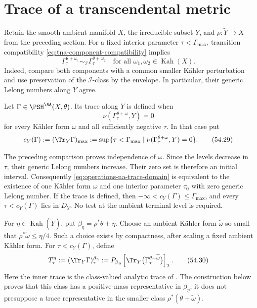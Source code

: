 \section{Trace of a transcendental metric}
\label{sec:operations-na-trace}

Retain the smooth ambient manifold $X$, the irreducible subset $Y$,
and $\rho:\widetilde Y\to X$ from the preceding section.
For a fixed interior parameter $\tau<\Gamma_{\max}$, transition
compatibility \eqref{eq:tna-component-compatibility} implies
\[
 \Gamma_\tau^{\theta+\omega_1}
 \sim_{\mathcal I}\Gamma_\tau^{\theta+\omega_2}
 \quad\text{for all }\omega_1,\omega_2\in\operatorname{Kah}(X).
\]
Indeed, compare both components with a common smaller K\"ahler
perturbation and use preservation of the $\mathcal I$-class by
the envelope.  In particular, their generic Lelong numbers along
$Y$ agree.

\begin{definition}
\label{def:operations-na-trace-domain}
Let $\Gamma\in\PSH^{\NA}(X,\theta)$.
Its trace along $Y$ is defined when
\[
 \nu(\Gamma_\tau^{\theta+\omega},Y)=0
\tag{54.28}\label{eq:operations-na-trace-domain}
\]
for every K\"ahler form $\omega$ and all sufficiently negative
$\tau$.  In that case put
\[
 c_Y(\Gamma):=(\Tr_Y\Gamma)_{\max}
 :=\sup\{\tau<\Gamma_{\max}\mid
          \nu(\Gamma_\tau^{\theta+\omega},Y)=0\}.
\tag{54.29}\label{eq:operations-na-trace-max}
\]
\end{definition}

The preceding comparison proves independence of $\omega$.
Since the levels decrease in $\tau$, their generic Lelong numbers
increase.  Their zero set is therefore an initial interval.
Consequently \eqref{eq:operations-na-trace-domain} is equivalent
to the existence of one K\"ahler form $\omega$ and one interior
parameter $\tau_0$ with zero generic Lelong number.
If the trace is defined, then
$-\infty<c_Y(\Gamma)\leq\Gamma_{\max}$, and every
$\tau<c_Y(\Gamma)$ lies in $D_Y$.
No test at the ambient terminal level is required.

For $\eta\in\operatorname{Kah}(\widetilde Y)$, put
$\beta_\eta=\rho^*\theta+\eta$.
Choose an ambient K\"ahler form $\widetilde\omega$ so small that
$\rho^*\widetilde\omega\leq\eta/4$.
Such a choice exists by compactness, after scaling a fixed ambient
K\"ahler form.  For $\tau<c_Y(\Gamma)$, define
\[
 T_\tau^\eta:=
 (\Tr_Y\Gamma)_\tau^{\beta_\eta}
 :=
 P_{\beta_\eta}
 \left[\Tr_Y\bigl(\Gamma_\tau^{\theta+\widetilde\omega}\bigr)
 \right]_{\mathcal I}.
\tag{54.30}\label{eq:operations-na-trace}
\]
Here the inner trace is the class-valued analytic trace of
.
The construction below proves that this class has a positive-mass
representative in $\beta_\eta$; it does not presuppose a trace
representative in the smaller class
$\rho^*(\theta+\widetilde\omega)$.

